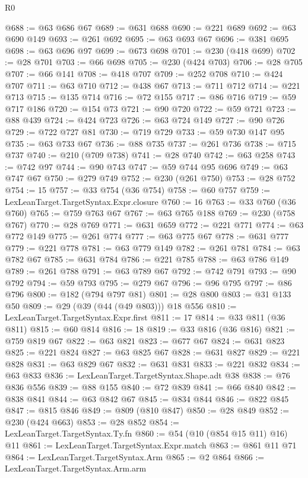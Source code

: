\begin{lexlean}{R0}
\begin{coremodule}
@688 := @63 @686 @67
@689 := @631 @688
@690 := @221 @689
@692 := @63 @690 @149
@693 := @261 @692
@695 := @63 @693 @67
@696 := @381 @695
@698 := @63 @696 @97
@699 := @673 @698
@701 := @230 (@418 @699)
@702 := @28 @701
@703 := @66 @698
@705 := @230 (@424 @703)
@706 := @28 @705
@707 := @66 @141
@708 := @418 @707
@709 := @252 @708
@710 := @424 @707
@711 := @63 @710
@712 := @438 @67
@713 := @711 @712
@714 := @221 @713
@715 := @135 @714
@716 := @72 @155
@717 := @86 @716
@719 := @59 @717 @186
@720 := @154 @73
@721 := @90 @720
@722 := @59 @721
@723 := @88 @439
@724 := @424 @723
@726 := @63 @724 @149
@727 := @90 @726
@729 := @722 @727 @81
@730 := @719 @729
@733 := @59 @730 @147 @95
@735 := @63 @733 @67
@736 := @88 @735
@737 := @261 @736
@738 := @715 @737
@740 := @210 (@709 @738)
@741 := @28 @740
@742 := @63 @258
@743 := @742 @97
@744 := @90 @743
@747 := @59 @744 @95 @696
@749 := @63 @747 @67
@750 := @279 @749
@752 := @230 (@261 @750)
@753 := @28 @752
@754 := 15
@757 := @33 @754 (@36 @754)
@758 := @60 @757
@759 := LexLeanTarget.TargetSyntax.Expr.closure
@760 := 16
@763 := @33 @760 (@36 @760)
@765 := @759 @763 @67
@767 := @63 @765 @188
@769 := @230 (@758 @767)
@770 := @28 @769
@771 := @631 @659
@772 := @221 @771
@774 := @63 @772 @149
@775 := @261 @774
@777 := @63 @775 @67
@778 := @631 @777
@779 := @221 @778
@781 := @63 @779 @149
@782 := @261 @781
@784 := @63 @782 @67
@785 := @631 @784
@786 := @221 @785
@788 := @63 @786 @149
@789 := @261 @788
@791 := @63 @789 @67
@792 := @742 @791
@793 := @90 @792
@794 := @59 @793
@795 := @279 @67
@796 := @96 @795
@797 := @86 @796
@800 := @182 (@794 @797 @81)
@801 := @28 @800
@803 := @31 @133 @50
@809 := @29 (@39 (@44 (@49 @803))) @18 @556
@810 := LexLeanTarget.TargetSyntax.Expr.first
@811 := 17
@814 := @33 @811 (@36 @811)
@815 := @60 @814
@816 := 18
@819 := @33 @816 (@36 @816)
@821 := @759 @819 @67
@822 := @63 @821
@823 := @677 @67
@824 := @631 @823
@825 := @221 @824
@827 := @63 @825 @67
@828 := @631 @827
@829 := @221 @828
@831 := @63 @829 @67
@832 := @631 @831
@833 := @221 @832
@834 := @63 @833
@836 := LexLeanTarget.TargetSyntax.Shape.adt @38
@838 := @76 @836 @556
@839 := @88 @155
@840 := @72 @839
@841 := @66 @840
@842 := @838 @841
@844 := @63 @842 @67
@845 := @834 @844
@846 := @822 @845
@847 := @815 @846
@849 := @809 (@810 @847)
@850 := @28 @849
@852 := @230 (@424 @663)
@853 := @28 @852
@854 := LexLeanTarget.TargetSyntax.Ty.fn
@860 := @54 (@10 (@854 @15 @11) @16) @11
@861 := LexLeanTarget.TargetSyntax.Expr.match
@863 := @861 @11 @71
@864 := LexLeanTarget.TargetSyntax.Arm
@865 := @2 @864
@866 := LexLeanTarget.TargetSyntax.Arm.arm

\end{coremodule}
\end{lexlean}
